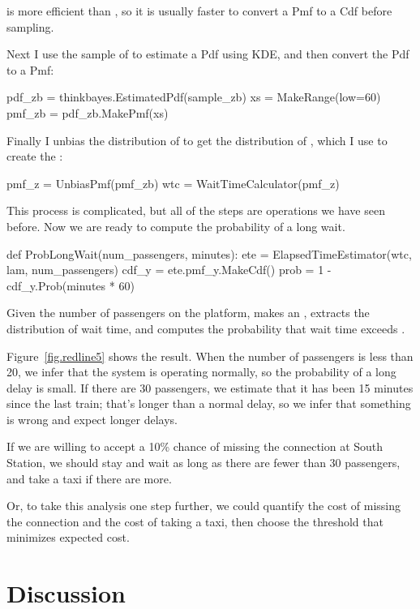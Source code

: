 \documentclass[12pt]{book}
\theoremstyle{exercise}
\begin{document}
 is more efficient than , so it
is usually faster to convert a Pmf to a Cdf before sampling.

Next I use the sample of  to estimate a Pdf using
KDE, and then convert the Pdf to a Pmf:

\begin{code}
    pdf_zb = thinkbayes.EstimatedPdf(sample_zb)
    xs = MakeRange(low=60)
    pmf_zb = pdf_zb.MakePmf(xs)
\end{code}

Finally I unbias the distribution of  to get the
distribution of , which I use to create the
:

\begin{code}
    pmf_z = UnbiasPmf(pmf_zb)
    wtc = WaitTimeCalculator(pmf_z)
\end{code}

This process is complicated, but
all of the steps are operations we have seen before.
Now we are ready to compute the probability of a long wait.

\begin{code}
def ProbLongWait(num_passengers, minutes):
    ete = ElapsedTimeEstimator(wtc, lam, num_passengers)
    cdf_y = ete.pmf_y.MakeCdf()
    prob = 1 - cdf_y.Prob(minutes * 60)
\end{code}

Given the number of passengers on the platform,
makes an ,
extracts the distribution of wait time, and 
computes 
the probability that wait time
exceeds .

Figure~\ref{fig.redline5} shows the result.  When the number of
passengers is less than 20, we infer that the system is
operating normally, so the probability of a long delay is small.
If there are 30 passengers, we estimate that it has been 15
minutes since the last train; that's longer than a normal delay,
so we infer that something is wrong and expect longer delays.

If we are willing to accept a 10\% chance of missing the connection
at South Station, we should stay and wait as long as there
are fewer than 30 passengers, and take a taxi if there are more.

Or, to take this analysis one step further, we could quantify the cost
of missing the connection and the cost of taking a taxi, then choose
the threshold that minimizes expected cost.

\section{Discussion}
\end{document}

